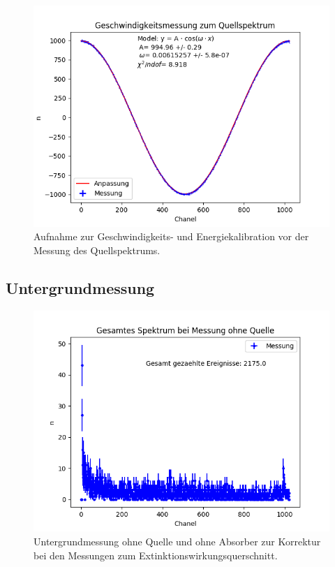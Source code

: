 \documentclass[12pt,a4paper]{article}
\begin{document}
\begin{figure}
\centering
\includegraphics[scale=0.8]{Bilder/Kalibration/Quellspektrum.png}
\caption{Aufnahme zur Geschwindigkeits- und Energiekalibration vor der Messung des Quellspektrums.}
\label{fig:Kalibration_Beispiel}
\end{figure}

\subsection{Untergrundmessung}
\begin{figure}
\centering
\includegraphics[scale=0.8]{Bilder/Extinktion/Rauschmessung.png}
\caption{Untergrundmessung ohne Quelle und ohne Absorber zur Korrektur bei den Messungen zum Extinktionswirkungsquerschnitt.}
\label{fig:Extinktion_Rauschmessung}
\end{figure}
\end{document}
